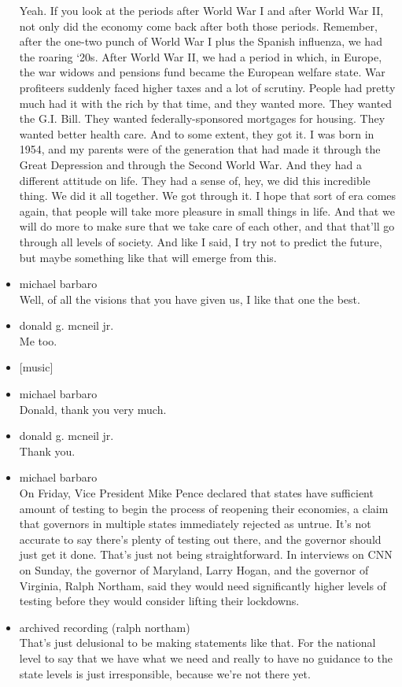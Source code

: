 \begin{itemize}
  Yeah. If you look at the periods after World War I and after World War
  II, not only did the economy come back after both those periods.
  Remember, after the one-two punch of World War I plus the Spanish
  influenza, we had the roaring `20s. After World War II, we had a
  period in which, in Europe, the war widows and pensions fund became
  the European welfare state. War profiteers suddenly faced higher taxes
  and a lot of scrutiny. People had pretty much had it with the rich by
  that time, and they wanted more. They wanted the G.I. Bill. They
  wanted federally-sponsored mortgages for housing. They wanted better
  health care. And to some extent, they got it. I was born in 1954, and
  my parents were of the generation that had made it through the Great
  Depression and through the Second World War. And they had a different
  attitude on life. They had a sense of, hey, we did this incredible
  thing. We did it all together. We got through it. I hope that sort of
  era comes again, that people will take more pleasure in small things
  in life. And that we will do more to make sure that we take care of
  each other, and that that'll go through all levels of society. And
  like I said, I try not to predict the future, but maybe something like
  that will emerge from this.
\item
  michael barbaro\\
  Well, of all the visions that you have given us, I like that one the
  best.
\item
  donald g. mcneil jr.\\
  Me too.
\item
  {[}music{]}
\item
  michael barbaro\\
  Donald, thank you very much.
\item
  donald g. mcneil jr.\\
  Thank you.
\item
  michael barbaro\\
  On Friday, Vice President Mike Pence declared that states have
  sufficient amount of testing to begin the process of reopening their
  economies, a claim that governors in multiple states immediately
  rejected as untrue. It's not accurate to say there's plenty of testing
  out there, and the governor should just get it done. That's just not
  being straightforward. In interviews on CNN on Sunday, the governor of
  Maryland, Larry Hogan, and the governor of Virginia, Ralph Northam,
  said they would need significantly higher levels of testing before
  they would consider lifting their lockdowns.
\item
  archived recording (ralph northam)\\
  That's just delusional to be making statements like that. For the
  national level to say that we have what we need and really to have no
  guidance to the state levels is just irresponsible, because we're not
  there yet.
\end{itemize}


